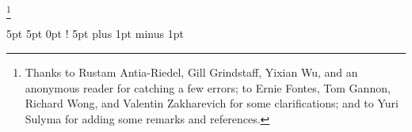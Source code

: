 
\author{Arun Debray}
\date{\today}
\thanks{Thanks to Rustam Antia-Riedel, Gill Grindstaff, Yixian Wu, and an anonymous reader for catching a few
errors; to Ernie Fontes, Tom Gannon, Richard Wong, and Valentin Zakharevich for some clarifications; and to Yuri
Sulyma for adding some remarks and references.}

\usepackage[charter]{mathdesign}
\usepackage[T1]{fontenc}
\usepackage{tikz}
\usetikzlibrary{shapes.geometric}

\renewcommand{\term}[1]{{\bfseries #1}}
\newcommand{\sSet}{\cat{sSet}}
\DeclareMathOperator{\Map}{Map}
\DeclareMathOperator{\rank}{rank\,}
\DeclareMathOperator{\Un}{Un}
\newcommand{\KU}{\mathit{KU}}
\newcommand{\isom}{\stackrel\cong\to}
\DeclareMathOperator{\Ind}{Ind}
\DeclareMathOperator{\CoInd}{CoInd}
\newcommand{\Spc}{\cat{Sp}}
\newcommand{\overwedge}{\mathbin{\overline\wedge}}
\DeclareMathOperator{\Ev}{Ev}
\newcommand{\sW}{\mathscr W}
\DeclareMathOperator{\Ho}{Ho}
\newcommand{\simeqto}{\stackrel\simeq\to}
\newcommand{\congto}{\stackrel\cong\to}

\newcommand{\LD}{\mathbf L}
\newcommand{\RD}{\mathbf R}

\DeclareMathOperator{\Lan}{Lan}
\DeclareMathOperator{\Ran}{Ran}

\newcommand{\matr}[4]{
  \begin{bmatrix} #1 & #2 \\ #3 & #4 \end{bmatrix}
}

\newcommand{\morph}{\mathop{\longrightarrow}\limits}
\newcommand{\twomorph}{\mathop{\Longrightarrow}\limits}

\newcommand{\dadjnctn}[6][2em]{
  \xymatrix@1@C=#1{
    #2 \ar@<2ex>[r]^-{#4} \ar@<-2ex>[r]_-{#6}
    \ar@{}@<1.2ex>[r]|-{\scriptscriptstyle\bot} \ar@{}@<-1.2ex>[r]|-{\scriptscriptstyle\bot}
    &
    #3 \ar[l]|-{#5}
  }
}

\theoremstyle{definition}
\newtheorem{ques}[equation]{Question}

  {5pt}   %
  {5pt}   %
  {\normalfont}  %
  {0pt}       %
  {\bfseries} %
  {!}         %
  {5pt plus 1pt minus 1pt} %
  {}          %
\theoremstyle{warning}
\newtheorem*{warn}{Warning}

\newcommand{\TODO}{\textcolor{red}{TODO}}
\newcommand{\citeme}[1]{[\textcolor{red}{CITE ME}: #1]}
